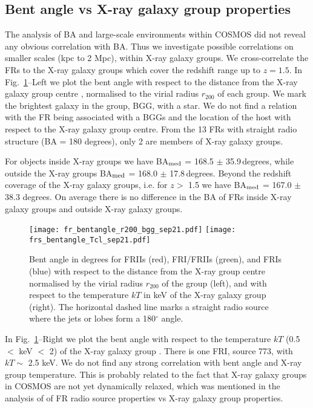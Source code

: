 \documentclass[galaxies,article,submit,moreauthors,pdftex]{Definitions/mdpi}
\begin{document}
\subsection{Bent angle vs X-ray galaxy group properties}

The analysis of BA and large-scale environments within COSMOS did not reveal any obvious correlation with BA. Thus we investigate possible correlations on smaller scales (kpc to 2 Mpc), within X-ray galaxy groups. We cross-correlate the FRs to the X-ray galaxy groups \citep{gozaliasl19} which cover the redshift range up to $z = 1.5$. In Fig.~\ref{fig:bent_r200_kt}--Left we plot the bent angle with respect to the distance from the X-ray galaxy group centre \citep{gozaliasl19}, normalised to the virial radius $r_{200}$ of each group. We mark the brightest galaxy in the group, BGG, with a star. We do not find a relation with the FR being associated with a BGGs and the location of the host with respect to the X-ray galaxy group centre. From the 13 FRs with straight radio structure (BA = 180 degrees), only 2 are members of X-ray galaxy groups.

For objects inside X-ray groups we have BA$_{\rm med}$ = 168.5 $\pm$ 35.9\,degrees, while outside the X-ray groups BA$_{\rm med}$ = 168.0 $\pm$ 17.8\,degrees. Beyond the redshift coverage of the X-ray galaxy groups, i.e. for $z >$ 1.5 we have BA$_{\rm med}$ = 167.0 $\pm$ 38.3 degrees. On average there is no difference in the BA of FRs inside X-ray galaxy groups and outside X-ray galaxy groups.

   \begin{figure}[!ht]
  \resizebox{\hsize}{!}
 {\texttt{[image: fr\_bentangle\_r200\_bgg\_sep21.pdf]}
\texttt{[image: frs\_bentangle\_Tcl\_sep21.pdf]}
            }
                 
       \caption{Bent angle in degrees for FRIIs (red), FRI/FRIIs (green), and FRIs (blue) with respect to the distance from the X-ray group centre normalised by the virial radius $r_{200}$ of the group (left), and with respect to the temperature $kT$ in keV of the X-ray galaxy group (right). The horizontal dashed line marks a straight radio source where the jets or lobes form a 180$^{\circ}$ angle.
   }
              \label{fig:bent_r200_kt}%
    \end{figure}


In Fig.~\ref{fig:bent_r200_kt}--Right we plot the bent angle with respect to the temperature $kT$ (0.5 $<$ keV $<$ 2) of the X-ray galaxy group \citep{gozaliasl19}. There is one FRI, source 773, with $kT \sim$ 2.5 keV. We do not find any strong correlation with bent angle and X-ray group temperature. This is probably related to the fact that X-ray galaxy groups in COSMOS are not yet dynamically relaxed, which was mentioned in the analysis of \citep{vardoulaki21} of FR radio source properties vs X-ray galaxy group properties. 
\end{document}
